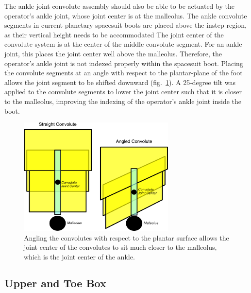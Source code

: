 \documentclass[defaultstyle,11pt]{comps}
\begin{document}
The ankle joint convolute assembly should also be able to be actuated by the operator's ankle joint, whose joint center is at the malleolus.
The ankle convolute segments in current planetary spacesuit boots are placed above the instep region, as their vertical height needs to be accommodated
The joint center of the convolute system is at the center of the middle convolute segment.
For an ankle joint, this places the joint center well above the malleolus.
Therefore, the operator's ankle joint is not indexed properly within the spacesuit boot.
Placing the convolute segments at an angle with respect to the plantar-plane of the foot allows the joint segment to be shifted downward (fig.~\ref{fig:SA3-convolute_ang}).
A 25-degree tilt was applied to the convolute segments to lower the joint center such that it is closer to the malleolus, improving the indexing of the operator's ankle joint inside the boot.

\begin{figure}
\hypertarget{fig:SA3-convolute_ang}{%
\centering
\includegraphics[width=0.7\textwidth,height=\textheight]{../fig/SA3/Convolute_Angled.png}
\caption{Angling the convolutes with respect to the plantar surface allows the joint center of the convolutes to sit much closer to the malleolus, which is the joint center of the ankle.}\label{fig:SA3-convolute_ang}
}
\end{figure}

\hypertarget{upper-and-toe-box}{%
\subsection{Upper and Toe Box}\label{upper-and-toe-box}}
\end{document}

